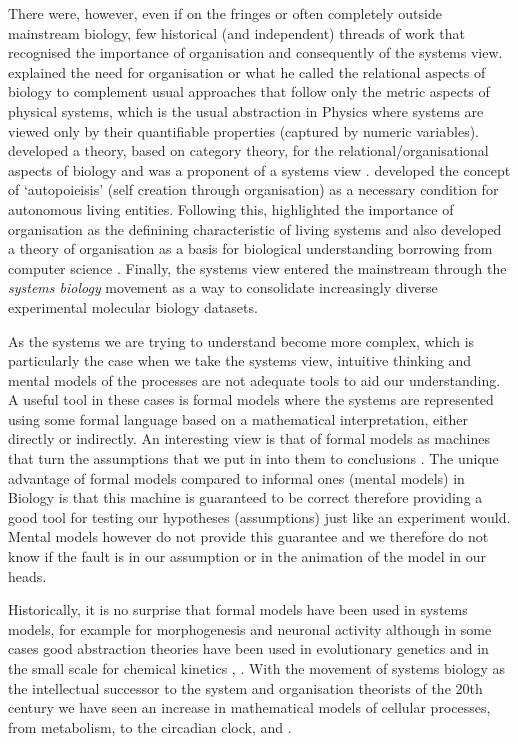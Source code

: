 There were, however, even if on the fringes or often completely outside
mainstream biology, few historical (and independent) threads of work that
recognised the importance of organisation and consequently of the systems
view. \citet{rashevsky_topology_1954} explained the need for organisation or
what he called the relational aspects of biology to complement usual approaches
that follow only the metric aspects of physical systems, which is the usual
abstraction in Physics where systems are viewed only by their quantifiable
properties (captured by numeric variables). \citet{rosen_relational_1958}
developed a theory, based on category theory, for the relational/organisational
aspects of biology and was a proponent of a systems view
\citep{rosen1991life}. \citet{varela_autopoiesis:_1974} developed the concept of
`autopoieisis' (self creation through organisation) as a necessary condition for
autonomous living entities. Following this, \citet{fontana_what_1994}
highlighted the importance of organisation as the definining characteristic of
living systems and also developed a theory of organisation as a basis for
biological understanding borrowing from computer science
\citep[$\lambda$-calculus in particular;][]{fontana_barrier_1996}. Finally, the
systems view entered the mainstream through the \emph{systems biology} movement
\citep{kitano2002systems} as a way to consolidate increasingly diverse
experimental molecular biology datasets.

As the systems we are trying to understand become more complex, which is
particularly the case when we take the systems view, intuitive thinking and
mental models of the processes are not adequate tools to aid our
understanding. A useful tool in these cases is formal models where the systems
are represented using some formal language based on a mathematical
interpretation, either directly or indirectly. An interesting view is that of
formal models as machines that turn the assumptions that we put in into them to
conclusions \citep{gunawardena_models_2014}. The unique advantage of formal
models compared to informal ones (mental models) in Biology is that this machine
is guaranteed to be correct therefore providing a good tool for testing our
hypotheses (assumptions) just like an experiment would. Mental models however do
not provide this guarantee and we therefore do not know if the fault is in our
assumption or in the animation of the model in our heads.

Historically, it is no surprise that formal models have been used in systems
models, for example for morphogenesis \citep{turing_chemical_1952} and neuronal
activity \citep{hodgkin_quantitative_1952} although in some cases good
abstraction theories have been used in evolutionary genetics \citep[by
abstracting away the organism;][]{dobzhansky1982genetics} and in the small scale
for chemical kinetics \citep{michaelis1913kinetics, gunawardena_lessons_2012}, 
\citep[see also;][]{gunawardena2013biology}. With the movement of systems
biology as the intellectual successor to the system and organisation theorists
of the 20th century we have seen an increase in mathematical models of cellular
processes, from metabolism, to the circadian clock, and .

